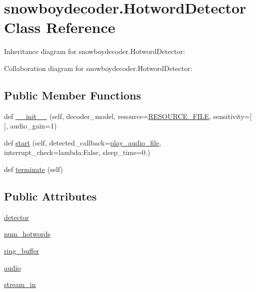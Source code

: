 \hypertarget{classsnowboydecoder_1_1HotwordDetector}{}\section{snowboydecoder.\+Hotword\+Detector Class Reference}
\label{classsnowboydecoder_1_1HotwordDetector}


Inheritance diagram for snowboydecoder.\+Hotword\+Detector\+:


Collaboration diagram for snowboydecoder.\+Hotword\+Detector\+:
\subsection*{Public Member Functions}
\begin{DoxyCompactItemize}
\item 
def \hyperlink{classsnowboydecoder_1_1HotwordDetector_a22091f02a8fea2f6065f8bc45addf7fc}{\+\_\+\+\_\+init\+\_\+\+\_\+} (self, decoder\+\_\+model, resource=\hyperlink{namespacesnowboydecoder_ae9aa648d909800942df02cc34b56b83a}{R\+E\+S\+O\+U\+R\+C\+E\+\_\+\+F\+I\+LE}, sensitivity=\mbox{[}$\,$\mbox{]}, audio\+\_\+gain=1)
\item 
def \hyperlink{classsnowboydecoder_1_1HotwordDetector_a0b753c51c1a02be091a7673870cd74e6}{start} (self, detected\+\_\+callback=\hyperlink{namespacesnowboydecoder_a828506a06fcca3526430747208f904aa}{play\+\_\+audio\+\_\+file}, interrupt\+\_\+check=lambda\+:\+False, sleep\+\_\+time=0.)
\item 
def \hyperlink{classsnowboydecoder_1_1HotwordDetector_a1ab6e303be1e4dbd5adaa9b9d29dfa1a}{terminate} (self)
\end{DoxyCompactItemize}
\subsection*{Public Attributes}
\begin{DoxyCompactItemize}
\item 
\hyperlink{classsnowboydecoder_1_1HotwordDetector_a443f1b4a74ff9e6dab682d9161b7aa52}{detector}
\item 
\hyperlink{classsnowboydecoder_1_1HotwordDetector_a45759e8fb8047abaf3697071cb88364c}{num\+\_\+hotwords}
\item 
\hyperlink{classsnowboydecoder_1_1HotwordDetector_ae5f5881d045e26f9e750b5e03c99f29c}{ring\+\_\+buffer}
\item 
\hyperlink{classsnowboydecoder_1_1HotwordDetector_a747f6301374f25541183bd2b7f0baac6}{audio}
\item 
\hyperlink{classsnowboydecoder_1_1HotwordDetector_a2658be70bb0b1939517e24f008d392a2}{stream\+\_\+in}
\end{DoxyCompactItemize}


